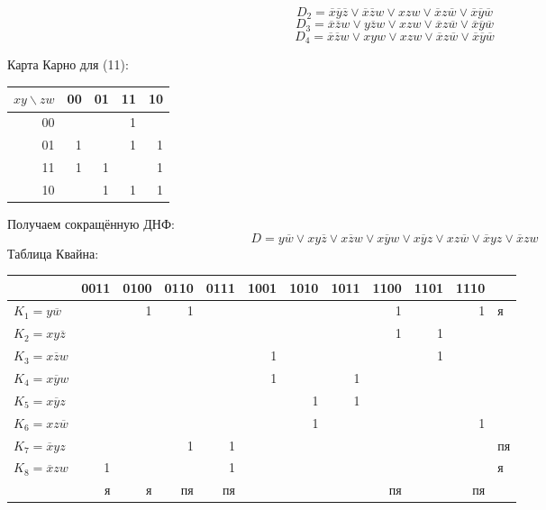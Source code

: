 \documentclass[11pt]{article}
\begin{document}
\begin{equation}
D_2 = \overline{x}\overline{y}\overline{z} \vee \overline{x}\overline{z}w \vee xzw \vee
\overline{x}z\overline{w} \vee \overline{x}\overline{y}\overline{w}
\end{equation}
\begin{equation}
D_3 = \overline{x}\overline{z}w \vee y\overline{z}w \vee xzw \vee \overline{x}z\overline{w} \vee
\overline{x}\overline{y}\overline{w}
\end{equation}
\begin{equation}
D_4 = \overline{x}\overline{z}w \vee xyw \vee xzw \vee \overline{x}z\overline{w} \vee
\overline{x}\overline{y}\overline{w}
\end{equation}

Карта Карно для (11):
\begin{center}
\begin{tabular}{rrrrr}
\hline
\(xy\backslash zw\) & 00 & 01 & 11 & 10\\
\hline
00 &  &  & 1 & \\
01 & 1 &  & 1 & 1\\
11 & 1 & 1 &  & 1\\
10 &  & 1 & 1 & 1\\
\hline
\end{tabular}
\end{center}
Получаем сокращённую ДНФ:
\begin{equation}
D = y\overline{w} \vee xy\overline{z} \vee x\overline{z}w \vee x\overline{y}w \vee
x\overline{y}z \vee xz\overline{w} \vee \overline{x}yz \vee \overline{x}zw
\end{equation}
Таблица Квайна:
\begin{center}
\begin{tabular}{lrrrrrrrrrrl}
\hline
 & 0011 & 0100 & 0110 & 0111 & 1001 & 1010 & 1011 & 1100 & 1101 & 1110 & \\
\hline
\(K_1 = y\overline{w}\) &  & 1 & 1 &  &  &  &  & 1 &  & 1 & я\\
\(K_2 = xy\overline{z}\) &  &  &  &  &  &  &  & 1 & 1 &  & \\
\(K_3 = x\overline{z}w\) &  &  &  &  & 1 &  &  &  & 1 &  & \\
\(K_4 = x\overline{y}w\) &  &  &  &  & 1 &  & 1 &  &  &  & \\
\(K_5 = x\overline{y}z\) &  &  &  &  &  & 1 & 1 &  &  &  & \\
\(K_6 = xz\overline{w}\) &  &  &  &  &  & 1 &  &  &  & 1 & \\
\(K_7 = \overline{x}yz\) &  &  & 1 & 1 &  &  &  &  &  &  & пя\\
\(K_8 = \overline{x}zw\) & 1 &  &  & 1 &  &  &  &  &  &  & я\\
\hline
 & я & я & пя & пя &  &  &  & пя &  & пя & \\
\hline
\end{tabular}
\end{center}
\end{document}
